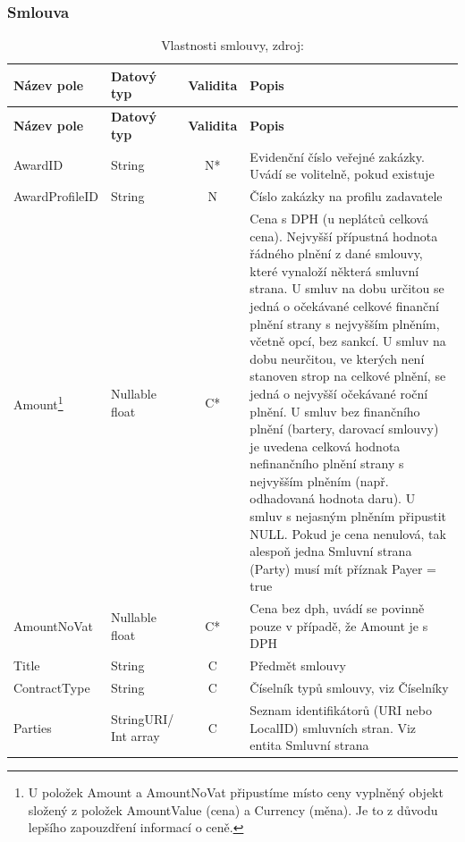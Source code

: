 \subsubsection*{Smlouva}

\begin{center}
\begin{longtable}{lp{20mm}cp{65mm}}
\label{grid_mlmmh} \\
\multicolumn{1}{l}{\textbf{Název pole}} & 
\multicolumn{1}{l}{\textbf{Datový typ}} & 
\multicolumn{1}{l}{\textbf{Validita}} & 
\multicolumn{1}{l}{\textbf{Popis}} \\ \hline 
\endfirsthead
\multicolumn{1}{l}{\textbf{Název pole}} & 
\multicolumn{1}{l}{\textbf{Datový typ}} & 
\multicolumn{1}{l}{\textbf{Validita}} & 
\multicolumn{1}{l}{\textbf{Popis}} \\ \hline 
\hline
\endhead
\endfoot
\caption[Vlastnosti smlouvy]{Vlastnosti smlouvy, zdroj:\cite{metodika, standard}}
\endlastfoot
AwardID & String & N* & Evidenční číslo veřejné zakázky. Uvádí se volitelně, pokud existuje \\
AwardProfileID & String & N & Číslo zakázky na profilu zadavatele \\
\rowcolor{validateC}Amount\footnote{U položek Amount a AmountNoVat připustíme místo ceny vyplněný objekt složený z položek AmountValue (cena) a Currency (měna). Je to z důvodu lepšího zapouzdření informací o ceně.} & Nullable float & C* & Cena s DPH (u neplátců celková cena). Nejvyšší přípustná hodnota řádného plnění z dané smlouvy, které vynaloží některá smluvní strana. U smluv na dobu určitou se jedná o očekávané celkové finanční plnění strany s nejvyšším plněním, včetně opcí, bez sankcí. U smluv na dobu neurčitou, ve kterých není stanoven strop na celkové plnění, se jedná o nejvyšší očekávané roční plnění. U smluv bez finančního plnění (bartery, darovací smlouvy) je uvedena celková hodnota nefinančního plnění strany s nejvyšším plněním (např. odhadovaná hodnota daru). U smluv s nejasným plněním připustit NULL. Pokud je cena nenulová, tak alespoň jedna Smluvní strana (Party) musí mít příznak Payer = true \\
\rowcolor{validateC}AmountNoVat & Nullable float & C* & Cena bez dph, uvádí se povinně pouze v případě, že Amount je s DPH \\
\rowcolor{validateC}Title & String & C & Předmět smlouvy \\
\rowcolor{validateC}ContractType & String & C & Číselník typů smlouvy, viz Číselníky \\
\rowcolor{validateC}Parties & StringURI/ Int array & C & Seznam identifikátorů (URI nebo LocalID) smluvních stran. Viz entita Smluvní strana \\

\end{longtable}
\end{center}
